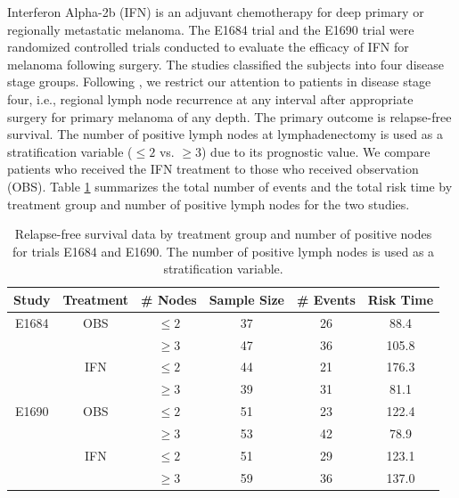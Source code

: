 Interferon Alpha-2b (IFN) is an adjuvant chemotherapy for deep primary or regionally metastatic melanoma. The E1684 trial \citep{kirkwood_1996} and the E1690 trial \citep{kirwood_2000} were randomized controlled trials conducted to evaluate the efficacy of IFN for melanoma following surgery. The studies classified the subjects into four disease stage groups. Following \cite{Psioda_Ibrahim_2019}, we restrict our attention to patients in disease stage four, i.e., regional lymph node recurrence at any interval after appropriate surgery for primary melanoma of any depth. The primary outcome is relapse-free survival. The number of positive lymph nodes at lymphadenectomy is used as a stratification variable ($\le 2$ vs. $\ge 3$) due to its prognostic value. We compare patients who received the IFN treatment to those who received observation (OBS). Table \ref{summary} summarizes the total number of events and the total risk time by treatment group and number of positive lymph nodes for the two studies.

\begin{table}[H]
\centering
\begin{tabular}{cccccc}
\hline
Study & Treatment & \# Nodes & Sample Size & \# Events & Risk Time \\[8pt]
\hline
E1684 & OBS & $\le 2$ & 37 & 26 & 88.4\\
   & & $\ge 3$ & 47 & 36 & 105.8\\
 &IFN & $\le 2$ & 44 & 21 & 176.3\\
&    & $\ge 3$ & 39 & 31 & 81.1\\
\hline
E1690 & OBS & $\le 2$ & 51 & 23 & 122.4\\
   & & $\ge 3$ & 53 & 42 & 78.9\\
 &IFN & $\le 2$ & 51 & 29 & 123.1\\
&    & $\ge 3$ & 59 & 36 & 137.0\\
\hline
\end{tabular}
\caption{Relapse-free survival data by treatment group and number of positive nodes for trials E1684 and E1690. The number of positive lymph nodes is used as a stratification variable.}
\label{summary}
\end{table}

